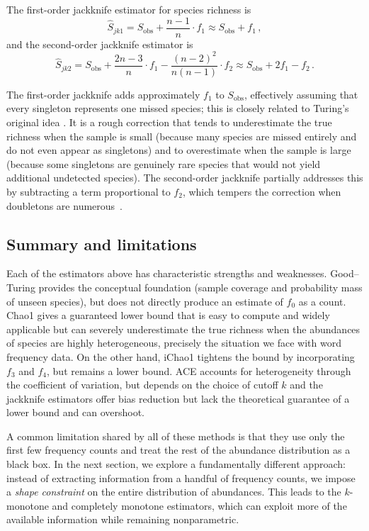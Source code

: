 ﻿\documentclass{article}
\begin{document}
The first-order jackknife estimator for species richness is
\begin{equation}\label{eq:jk1}
    \hat{S}_{jk1} = S_{\mathrm{obs}} + \frac{n-1}{n} \cdot f_1 
    \approx S_{\mathrm{obs}} + f_1\,,
\end{equation}
and the second-order jackknife estimator is
\begin{equation}\label{eq:jk2}
    \hat{S}_{jk2} = S_{\mathrm{obs}} + \frac{2n-3}{n} \cdot f_1 
    - \frac{(n-2)^2}{n(n-1)} \cdot f_2 
    \approx S_{\mathrm{obs}} + 2f_1 - f_2\,.
\end{equation}
 
The first-order jackknife adds approximately $f_1$ to $S_{\mathrm{obs}}$, effectively assuming that every singleton represents one missed species; this is closely related to Turing’s original idea . It is a rough correction that tends to underestimate the true richness when the sample is small (because many species are missed entirely and do not even appear as singletons) and to overestimate when the sample is large (because some singletons are genuinely rare species that would not yield additional undetected species). The second-order jackknife partially addresses this by subtracting a term proportional to $f_2$, which tempers the correction when doubletons are numerous~\cite{burnham1979}.

\subsection{Summary and limitations}
 
Each of the estimators above has characteristic strengths and weaknesses. Good--Turing provides the conceptual foundation (sample coverage and probability mass of unseen species), but does not directly produce an estimate of $f_0$ as a count. Chao1 gives a guaranteed lower bound that is easy to compute and widely applicable but can severely underestimate the true richness when the abundances of species are highly heterogeneous, precisely the situation we face with word frequency data. On the other hand, iChao1 tightens the bound by incorporating $f_3$ and $f_4$, but remains a lower bound. ACE accounts for heterogeneity through the coefficient of variation, but depends on the choice of cutoff $k$ and the jackknife estimators offer bias reduction but lack the theoretical guarantee of a lower bound and can overshoot.
 
A common limitation shared by all of these methods is that they use  only the first few frequency counts and treat the rest of the abundance distribution as a black box. In the next section, we explore a fundamentally different approach: instead of extracting information from a handful of frequency counts, we impose a \emph{shape constraint} on the entire distribution of abundances. This leads to the $k$-monotone and completely monotone estimators, which can exploit more of the available information while remaining nonparametric.
\end{document}
